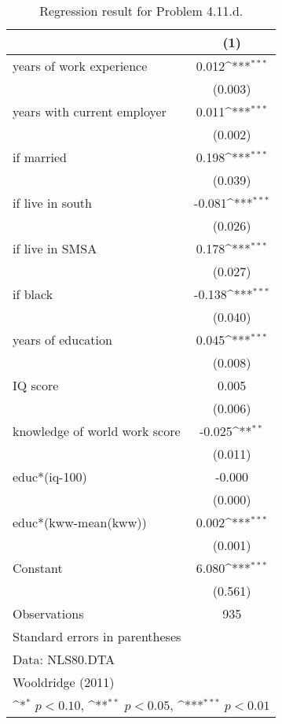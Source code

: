 \begin{table}[htbp]\centering
\def\sym#1{\ifmmode^{#1}\else\(^{#1}\)\fi}
\caption{Regression result for Problem 4.11.d.}
\begin{tabular}{l*{1}{c}}
\toprule
                    &\multicolumn{1}{c}{(1)}         \\
\midrule
years of work experience&       0.012\sym{***}\\
                    &     (0.003)         \\
\addlinespace
years with current employer&       0.011\sym{***}\\
                    &     (0.002)         \\
\addlinespace
=1 if married       &       0.198\sym{***}\\
                    &     (0.039)         \\
\addlinespace
=1 if live in south &      -0.081\sym{***}\\
                    &     (0.026)         \\
\addlinespace
=1 if live in SMSA  &       0.178\sym{***}\\
                    &     (0.027)         \\
\addlinespace
=1 if black         &      -0.138\sym{***}\\
                    &     (0.040)         \\
\addlinespace
years of education  &       0.045\sym{***}\\
                    &     (0.008)         \\
\addlinespace
IQ score            &       0.005         \\
                    &     (0.006)         \\
\addlinespace
knowledge of world work score&      -0.025\sym{**} \\
                    &     (0.011)         \\
\addlinespace
educ*(iq-100)       &      -0.000         \\
                    &     (0.000)         \\
\addlinespace
educ*(kww-mean(kww))&       0.002\sym{***}\\
                    &     (0.001)         \\
\addlinespace
Constant            &       6.080\sym{***}\\
                    &     (0.561)         \\
\midrule
Observations        &         935         \\
\bottomrule
\multicolumn{2}{l}{\footnotesize Standard errors in parentheses}\\
\multicolumn{2}{l}{\footnotesize Data: NLS80.DTA}\\
\multicolumn{2}{l}{\footnotesize Wooldridge (2011)}\\
\multicolumn{2}{l}{\footnotesize \sym{*} \(p<0.10\), \sym{**} \(p<0.05\), \sym{***} \(p<0.01\)}\\
\end{tabular}
\end{table}

